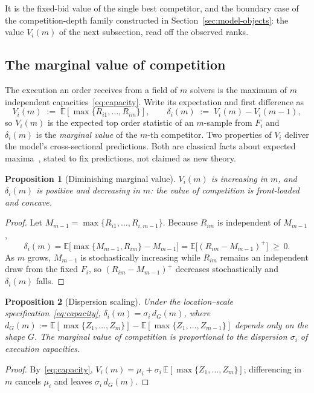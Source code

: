 \documentclass[11pt]{article}
\theoremstyle{plain}
\newtheorem{proposition}{Proposition}
\theoremstyle{definition}
\theoremstyle{remark}
\newcommand{\E}{\mathbb{E}}
\begin{document}
\noindent It is the fixed-bid value of the single best competitor, and the boundary case of the competition-depth family constructed in Section~\ref{sec:model-objects}: the value $V_i(m)$ of the next subsection, read off the observed ranks.

\subsection{The marginal value of competition}\label{sec:model-value}
The execution an order receives from a field of $m$ solvers is the maximum of $m$ independent capacities~\eqref{eq:capacity}. Write its expectation and first difference as
\begin{equation}\label{eq:Vm}
V_i(m) \;:=\; \E\!\left[\max\{R_{i1},\dots,R_{im}\}\right],
\qquad
\delta_i(m) \;:=\; V_i(m)-V_i(m-1),
\end{equation}
so $V_i(m)$ is the expected top order statistic of an $m$-sample from $F_i$ and $\delta_i(m)$ is the \emph{marginal value} of the $m$-th competitor. Two properties of $V_i$ deliver the model's cross-sectional predictions. Both are classical facts about expected maxima~\citep{david2003order}, stated to fix predictions, not claimed as new theory.

\begin{proposition}[Diminishing marginal value]\label{prop:diminishing}
$V_i(m)$ is increasing in $m$, and $\delta_i(m)$ is positive and decreasing in $m$: the value of competition is front-loaded and concave.
\end{proposition}
\begin{proof}
Let $M_{m-1}=\max\{R_{i1},\dots,R_{i,m-1}\}$. Because $R_{im}$ is independent of $M_{m-1}$,
\[
\delta_i(m)=\E\!\big[\max\{M_{m-1},R_{im}\}-M_{m-1}\big]=\E\!\big[(R_{im}-M_{m-1})^+\big]\ \ge\ 0 .
\]
As $m$ grows, $M_{m-1}$ is stochastically increasing while $R_{im}$ remains an independent draw from the fixed $F_i$, so $(R_{im}-M_{m-1})^+$ decreases stochastically and $\delta_i(m)$ falls.
\end{proof}

\begin{proposition}[Dispersion scaling]\label{prop:dispersion}
Under the location--scale specification~\eqref{eq:capacity}, $\delta_i(m)=\sigma_i\,d_G(m)$, where
$d_G(m):=\E[\max\{Z_1,\dots,Z_m\}]-\E[\max\{Z_1,\dots,Z_{m-1}\}]$
depends only on the shape $G$. The marginal value of competition is proportional to the dispersion $\sigma_i$ of execution capacities.
\end{proposition}
\begin{proof}
By~\eqref{eq:capacity}, $V_i(m)=\mu_i+\sigma_i\,\E[\max\{Z_1,\dots,Z_m\}]$; differencing in $m$ cancels $\mu_i$ and leaves $\sigma_i\,d_G(m)$.
\end{proof}
\end{document}
